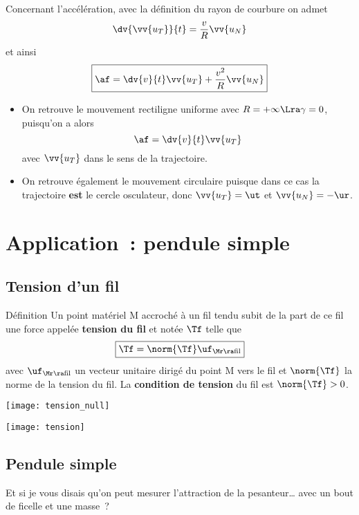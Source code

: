 \documentclass[../main/main.tex]{subfiles}
\begin{document}
Concernant l'accélération, avec la définition du rayon de courbure on admet
\[ \dv{\vv{u_T}}{t} = \frac{v}{R}\vv{u_N}\]
et ainsi
\[
	\boxed{\af = \dv{v}{t}\vv{u_T} + \frac{v^2}{R}\vv{u_N}}
\]

\begin{itemize}
	\item On retrouve le mouvement rectiligne uniforme avec $R = +\infty \Lra
		      \gamma = 0$, puisqu'on a alors
	      \[\af = \dv{v}{t}\vv{u_T}\]
	      avec $\vv{u_T}$ dans le sens de la trajectoire.

	\item On retrouve également le mouvement circulaire puisque dans ce cas la
	      trajectoire \textbf{est} le cercle osculateur, donc $\vv{u_T} = \ut$ et
	      $\vv{u_N} = -\ur$.
\end{itemize}

\section{Application~: pendule simple}

\subsection{Tension d'un fil}
\begin{tdefi}{Définition}
	Un point matériel M accroché à un fil tendu subit de la part de ce fil une
	force appelée \textbf{tension du fil} et notée $\Tf$ telle que
	\[\boxed{\Tf = \norm{\Tf}\uf_{\Mr\ra\rm fil}}\]
	avec $\uf_{\Mr\ra\rm fil}$ un vecteur unitaire dirigé du point M vers le fil
	et $\norm{\Tf}$ la norme de la tension du fil. La \textbf{condition de
		tension} du fil est $\norm{\Tf} > 0$.

	\begin{minipage}{0.45\linewidth}
		\begin{center}
			\texttt{[image: tension\_null]}
		\end{center}
	\end{minipage}
	\hfill
	\begin{minipage}{0.45\linewidth}
		\begin{center}
			\texttt{[image: tension]}%
		\end{center}
	\end{minipage}
\end{tdefi}

\subsection{Pendule simple}
Et si je vous disais qu'on peut mesurer l'attraction de la pesanteur… avec un
bout de ficelle et une masse~?
\bigbreak
\end{document}
